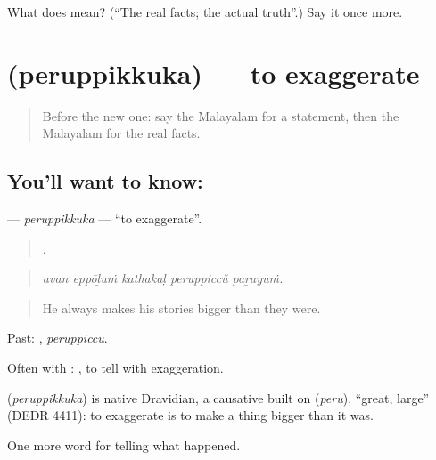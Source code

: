 \begin{tcolorbox}[breakable,colback=teal!4,colframe=teal!35!black,title={Before you move on}]
What does  mean? (\textquotedblleft{}The real facts; the actual truth\textquotedblright{}.) Say it once more.
\end{tcolorbox}
\section[\texorpdfstring{\ml{പെരുപ്പിക്കുക} (peruppikkuka)}{പെരുപ്പിക്കുക (peruppikkuka)}]{ (peruppikkuka) — to exaggerate}

\label{lesson:ML-C352-peruppikkuka}



\begin{quote}
Before the new one: say the Malayalam for a statement, then the Malayalam for the real facts.
\end{quote}

\subsection*{You'll want to know: }
\textbf{} — \emph{peruppikkuka} — \textquotedblleft{}to exaggerate\textquotedblright{}.

\begin{quote}
    .
\end{quote}

\begin{quote}
\emph{avan eppōḻuṁ kathakaḷ peruppiccŭ paṟayuṁ.}
\end{quote}

\begin{quote}
He always makes his stories bigger than they were.
\end{quote}

Past: , \emph{peruppiccu}.

Often with :  , to tell with exaggeration.

\begin{cousinweb}
\textbf{} (\emph{peruppikkuka}) is native Dravidian, a causative built on  (\emph{peru}), \textquotedblleft{}great, large\textquotedblright{} (DEDR 4411): to exaggerate is to make a thing bigger than it was.
\end{cousinweb}

\begin{grammarlens}[title={What you've built}]
One more word for telling what happened.
\end{grammarlens}

